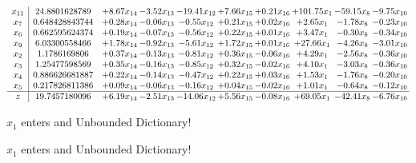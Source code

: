 \documentclass[9pt]{article}
\begin{document}
 \[\begin{array}{c| c c@{\hskip 2pt} c@{\hskip 2pt} c@{\hskip 2pt} c@{\hskip 2pt} c@{\hskip 2pt} c@{\hskip 2pt} c@{\hskip 2pt} c@{\hskip 2pt} }
 x_{11}   &  24.8801628789 & +  8.67 x_{14} & -3.52 x_{13} & -19.41 x_{12} & +  7.66 x_{15} & +  0.21 x_{16} & + 101.75 x_{1} & -59.15 x_{8} & -9.75 x_{10}\\
 x_{7}   &  0.648428843744 & +  0.28 x_{14} & -0.06 x_{13} & -0.55 x_{12} & +  0.21 x_{15} & +  0.02 x_{16} & +  2.65 x_{1} & -1.78 x_{8} & -0.23 x_{10}\\
 x_{6}   &  0.662595624374 & +  0.19 x_{14} & -0.07 x_{13} & -0.56 x_{12} & +  0.22 x_{15} & +  0.01 x_{16} & +  3.47 x_{1} & -0.30 x_{8} & -0.34 x_{10}\\
 x_{9}   &  6.03300558466 & +  1.78 x_{14} & -0.92 x_{13} & -5.61 x_{12} & +  1.72 x_{15} & +  0.01 x_{16} & + 27.66 x_{1} & -4.26 x_{8} & -3.01 x_{10}\\
 x_{2}   &  1.1786169806 & +  0.37 x_{14} & -0.13 x_{13} & -0.81 x_{12} & +  0.36 x_{15} & -0.06 x_{16} & +  4.29 x_{1} & -2.56 x_{8} & -0.36 x_{10}\\
 x_{3}   &  1.25477598569 & +  0.35 x_{14} & -0.16 x_{13} & -0.85 x_{12} & +  0.32 x_{15} & -0.02 x_{16} & +  4.10 x_{1} & -3.03 x_{8} & -0.36 x_{10}\\
 x_{4}   &  0.886626681887 & +  0.22 x_{14} & -0.14 x_{13} & -0.47 x_{12} & +  0.22 x_{15} & +  0.03 x_{16} & +  1.53 x_{1} & -1.76 x_{8} & -0.20 x_{10}\\
 x_{5}   &  0.217826811386 & +  0.09 x_{14} & -0.06 x_{13} & -0.16 x_{12} & +  0.04 x_{15} & -0.02 x_{16} & +  1.01 x_{1} & -0.64 x_{8} & -0.12 x_{10}\\
\hline
z    &  19.7457180096 & +  6.19 x_{14} & -2.51 x_{13} & -14.06 x_{12} & +  5.56 x_{15} & -0.08 x_{16} & + 69.05 x_{1} & -42.41 x_{8} & -6.76 x_{10}\\
\end{array}\]


 $ x_{1} $ enters and Unbounded Dictionary!


 $ x_{1} $ enters and Unbounded Dictionary!
\end{document}
